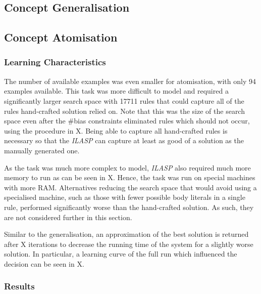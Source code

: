 

\subsection{Concept Generalisation}

\subsection{Concept Atomisation}

\subsubsection{Learning Characteristics}

The number of available examples was even smaller for atomisation, with only 94 examples available.
This task was more difficult to model and required a significantly larger search space with 17711 rules that could capture all of the rules hand-crafted solution relied on.
Note that this was the size of the search space even after the \#bias constraints eliminated rules which should not occur, using the procedure in X.
Being able to capture all hand-crafted rules is necessary so that the \textit{ILASP} can capture at least as good of a solution as the manually generated one.

As the task was much more complex to model, \textit{ILASP} also required much more memory to run as can be seen in X. 
Hence, the task was run on special machines with more RAM.
Alternatives reducing the search space that would avoid using a specialised machine, such as those with fewer possible body literals in a single rule, performed significantly worse than the hand-crafted solution.
As such, they are not considered further in this section.

Similar to the generalisation, an approximation of the best solution is returned after X iterations to decrease the running time of the system for a slightly worse solution.
In particular, a learning curve of the full run which influenced the decision can be seen in X.


\subsubsection{Results}

